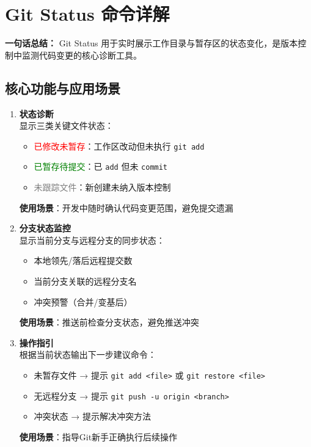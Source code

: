 \section{Git Status 命令详解}
\textbf{一句话总结：}  
Git Status 用于实时展示工作目录与暂存区的状态变化，是版本控制中监测代码变更的核心诊断工具。

\subsection{核心功能与应用场景}
\begin{enumerate}[leftmargin=*, nosep]
    \item \textbf{状态诊断}  \\
    显示三类关键文件状态：
    \begin{itemize}[leftmargin=*, nosep]
        \item \textcolor{red}{已修改未暂存}：工作区改动但未执行 \texttt{git add}
        \item \textcolor{green}{已暂存待提交}：已 \texttt{add} 但未 \texttt{commit}
        \item \textcolor{gray}{未跟踪文件}：新创建未纳入版本控制
    \end{itemize}
    \textbf{使用场景}：开发中随时确认代码变更范围，避免提交遗漏
    
    \item \textbf{分支状态监控}  \\
    显示当前分支与远程分支的同步状态：
    
\begin{itemize}[leftmargin=*, nosep]
        \item 本地领先/落后远程提交数
        \item 当前分支关联的远程分支名
        \item 冲突预警（合并/变基后）
    \end{itemize}
    \textbf{使用场景}：推送前检查分支状态，避免推送冲突
    
    \item \textbf{操作指引}  \\
    根据当前状态输出下一步建议命令：
    
\begin{itemize}[leftmargin=*, nosep]
        \item 未暂存文件 → 提示 \texttt{git add <file>} 或 \texttt{git restore <file>}
        \item 无远程分支 → 提示 \texttt{git push -u origin <branch>}
        \item 冲突状态 → 提示解决冲突方法
    \end{itemize}
    \textbf{使用场景}：指导Git新手正确执行后续操作
\end{enumerate}

